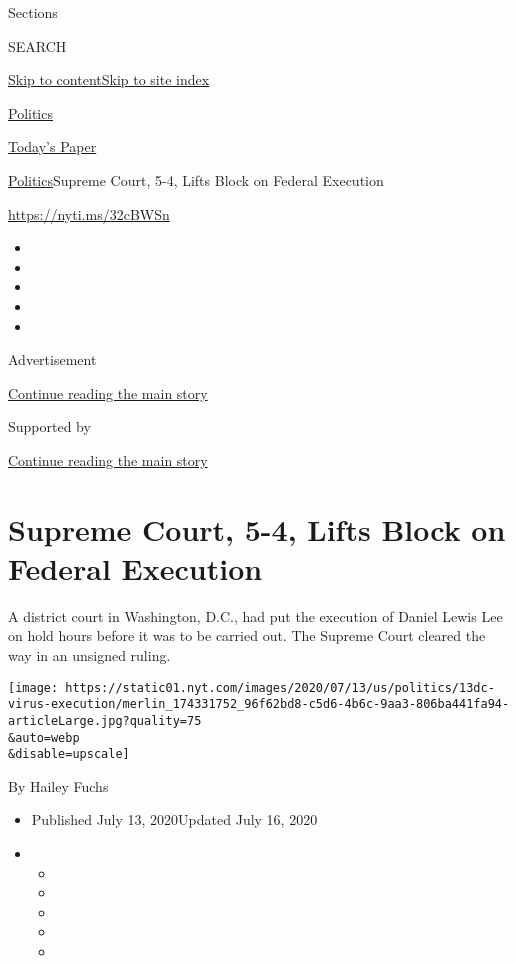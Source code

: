 Sections

SEARCH

\protect\hyperlink{site-content}{Skip to
content}\protect\hyperlink{site-index}{Skip to site index}

\href{https://www.nytimes.com/section/politics}{Politics}

\href{https://myaccount.nytimes.com/auth/login?response_type=cookie\&client_id=vi}{}

\href{https://www.nytimes.com/section/todayspaper}{Today's Paper}

\href{/section/politics}{Politics}\textbar{}Supreme Court, 5-4, Lifts
Block on Federal Execution

\url{https://nyti.ms/32cBWSn}

\begin{itemize}
\item
\item
\item
\item
\item
\end{itemize}

Advertisement

\protect\hyperlink{after-top}{Continue reading the main story}

Supported by

\protect\hyperlink{after-sponsor}{Continue reading the main story}

\hypertarget{supreme-court-5-4-lifts-block-on-federal-execution}{%
\section{Supreme Court, 5-4, Lifts Block on Federal
Execution}\label{supreme-court-5-4-lifts-block-on-federal-execution}}

A district court in Washington, D.C., had put the execution of Daniel
Lewis Lee on hold hours before it was to be carried out. The Supreme
Court cleared the way in an unsigned ruling.

\texttt{[image: https://static01.nyt.com/images/2020/07/13/us/politics/13dc-virus-execution/merlin\_174331752\_96f62bd8-c5d6-4b6c-9aa3-806ba441fa94-articleLarge.jpg?quality=75\\\&auto=webp\\\&disable=upscale]}

By Hailey Fuchs

\begin{itemize}
\item
  Published July 13, 2020Updated July 16, 2020
\item
  \begin{itemize}
  \item
  \item
  \item
  \item
  \item
  \end{itemize}
\end{itemize}

